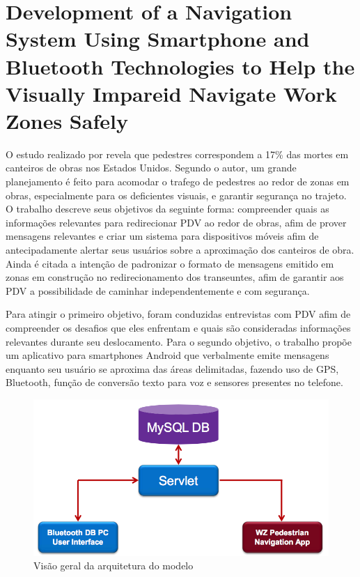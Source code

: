 \documentclass[english,brazilian]{UNISINOSmonografia}
\begin{document}
	\section{Development of a Navigation System Using Smartphone and Bluetooth Technologies to Help the Visually Impareid Navigate Work Zones Safely} 

O estudo realizado por  revela que pedestres correspondem a 17\% das mortes em canteiros de obras nos Estados Unidos. Segundo o autor, um grande planejamento é feito para acomodar o trafego de pedestres ao redor de zonas em obras, especialmente para os deficientes visuais, e garantir segurança no trajeto. O trabalho descreve seus objetivos da seguinte forma: compreender quais as informações relevantes para redirecionar PDV ao redor de obras, afim de prover mensagens relevantes e criar um sistema para dispositivos móveis afim de antecipadamente alertar seus usuários sobre a aproximação dos canteiros de obra. Ainda é citada a intenção de padronizar o formato de mensagens emitido em zonas em construção no redirecionamento dos transeuntes, afim de garantir aos PDV a possibilidade de caminhar independentemente e com segurança.

Para atingir o primeiro objetivo, foram conduzidas entrevistas com PDV afim de compreender os desafios que eles enfrentam e quais são consideradas informações relevantes durante seu deslocamento. Para o segundo objetivo, o trabalho propõe um aplicativo para smartphones Android que verbalmente emite mensagens enquanto seu usuário se aproxima das áreas delimitadas, fazendo uso de GPS, Bluetooth, função de conversão texto para voz e sensores presentes no telefone. 

\FloatBarrier
\begin{figure}
	\caption{Visão geral da arquitetura do modelo}
	\label{fig:visaoGeralWorkzones}
	\centering%
	\begin{minipage}{.6\textwidth}
		\includegraphics[width=\textwidth]{imgs/workzoneArquitetura}
		\end{minipage}
\end{figure}
\FloatBarrier
\end{document}
